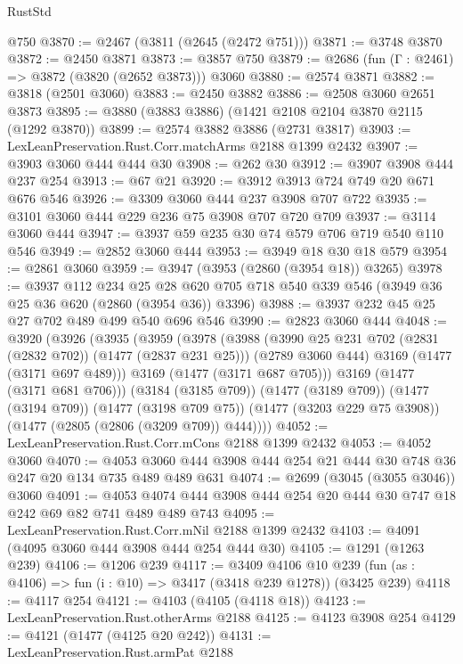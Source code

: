 \begin{lexlean}{RustStd}
\begin{coremodule}
    @750
@3870 := @2467 (@3811 (@2645 (@2472 @751)))
@3871 := @3748 @3870
@3872 := @2450 @3871
@3873 := @3857 @750
@3879 := @2686 (fun (Γ : @2461) => @3872 (@3820 (@2652 @3873))) @3060
@3880 := @2574 @3871
@3882 := @3818 (@2501 @3060)
@3883 := @2450 @3882
@3886 := @2508 @3060 @2651 @3873
@3895 := @3880 (@3883 @3886) (@1421 @2108 @2104 @3870 @2115 (@1292 @3870))
@3899 := @2574 @3882 @3886 (@2731 @3817)
@3903 := LexLeanPreservation.Rust.Corr.matchArms @2188 @1399 @2432
@3907 := @3903 @3060 @444 @444 @30
@3908 := @262 @30
@3912 := @3907 @3908 @444 @237 @254
@3913 := @67 @21
@3920 := @3912 @3913 @724 @749 @20 @671 @676 @546
@3926 := @3309 @3060 @444 @237 @3908 @707 @722
@3935 := @3101 @3060 @444 @229 @236 @75 @3908 @707 @720 @709
@3937 := @3114 @3060 @444
@3947 := @3937 @59 @235 @30 @74 @579 @706 @719 @540 @110 @546
@3949 := @2852 @3060 @444
@3953 := @3949 @18 @30 @18 @579
@3954 := @2861 @3060
@3959 := @3947 (@3953 (@2860 (@3954 @18)) @3265)
@3978 := @3937
    @112
    @234
    @25
    @28
    @620
    @705
    @718
    @540
    @339
    @546
    (@3949 @36 @25 @36 @620 (@2860 (@3954 @36)) @3396)
@3988 := @3937 @232 @45 @25 @27 @702 @489 @499 @540 @696 @546
@3990 := @2823 @3060 @444
@4048 := @3920
    (@3926
      (@3935
        (@3959
          (@3978
            (@3988
              (@3990 @25 @231 @702 (@2831 (@2832 @702)) (@1477 (@2837 @231 @25)))
              (@2789 @3060 @444)
              @3169
              (@1477 (@3171 @697 @489)))
            @3169
            (@1477 (@3171 @687 @705)))
          @3169
          (@1477 (@3171 @681 @706)))
        (@3184 (@3185 @709))
        (@1477 (@3189 @709))
        (@1477 (@3194 @709))
        (@1477 (@3198 @709 @75))
        (@1477 (@3203 @229 @75 @3908))
        (@1477 (@2805 (@2806 (@3209 @709)) @444))))
@4052 := LexLeanPreservation.Rust.Corr.mCons @2188 @1399 @2432
@4053 := @4052 @3060
@4070 := @4053 @3060 @444 @3908 @444 @254 @21 @444 @30 @748 @36 @247 @20 @134 @735 @489 @489 @631
@4074 := @2699 (@3045 (@3055 @3046)) @3060
@4091 := @4053 @4074 @444 @3908 @444 @254 @20 @444 @30 @747 @18 @242 @69 @82 @741 @489 @489 @743
@4095 := LexLeanPreservation.Rust.Corr.mNil @2188 @1399 @2432
@4103 := @4091 (@4095 @3060 @444 @3908 @444 @254 @444 @30)
@4105 := @1291 (@1263 @239)
@4106 := @1206 @239
@4117 := @3409
    @4106
    @10
    @239
    (fun (as : @4106) => fun (i : @10) => @3417 (@3418 @239 @1278))
    (@3425 @239)
@4118 := @4117 @254
@4121 := @4103 (@4105 (@4118 @18))
@4123 := LexLeanPreservation.Rust.otherArms @2188
@4125 := @4123 @3908 @254
@4129 := @4121 (@1477 (@4125 @20 @242))
@4131 := LexLeanPreservation.Rust.armPat @2188

\end{coremodule}
\end{lexlean}
